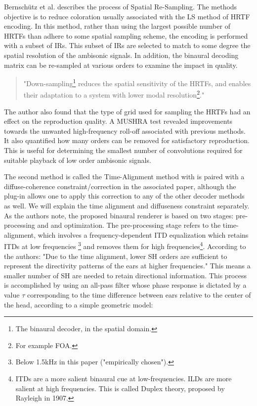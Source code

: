 Bernschütz et al. \cite{bernschutz2014binaural} describes the process of Spatial Re-Sampling. The methods objective is to reduce coloration usually associated with the LS method of HRTF encoding. In this method, rather than using the largest possible number of HRTFs than adhere to some spatial sampling scheme, the encoding is performed with a subset of IRs. This subset of IRs are selected to match to some degree the spatial resolution of the ambisonic signals. In addition, the binaural decoding matrix can be re-sampled at various orders to examine the impact in quality. 

\begin{quote}
    "Down-sampling\footnote{The binaural decoder, in the spatial domain.} reduces the spatial sensitivity of the HRTFs, and enables their adaptation to a system with lower modal resolution\footnote{For example FOA.}."
\end{quote}

The author also found that the type of grid used for sampling the HRTFs had an effect on the reproduction quality. A MUSHRA test revealed improvements towards the unwanted high-frequency roll-off associated with previous methods. It also quantified how many orders can be removed for satisfactory reproduction. This is useful for determining the smallest number of convolutions required for suitable playback of low order ambisonic signals.


The second method is called the Time-Alignment \cite{zaunschirm2018binaural} method with is paired with a diffuse-coherence constraint/correction in the associated paper, although the plug-in allows one to apply this correction to any of the other decoder methods as well. We will explain the time alignment and diffuseness constraint separately. As the authors note, the proposed binaural renderer is based on two stages: pre-processing and and optimization. The pre-processing stage refers to the time-alignment, which involves a frequency-dependent ITD equalization which retains ITDs at low frequencies \footnote{Below 1.5kHz in this paper ("empirically chosen").} and removes them for high frequencies\footnote{ITDs are a more salient binaural cue at low-frequencies. ILDs are more salient at high frequencies. This is called Duplex theory, proposed by Rayleigh in 1907.}. According to the authors: "Due to the time alignment, lower SH orders are sufficient to represent the directivity patterns of the ears at higher frequencies." This means a smaller number of SH are needed to retain directional information. This process is accomplished by using an all-pass filter whose phase response is dictated by a value $\tau$ corresponding to the time difference between ears relative to the center of the head, according to a simple geometric model:

